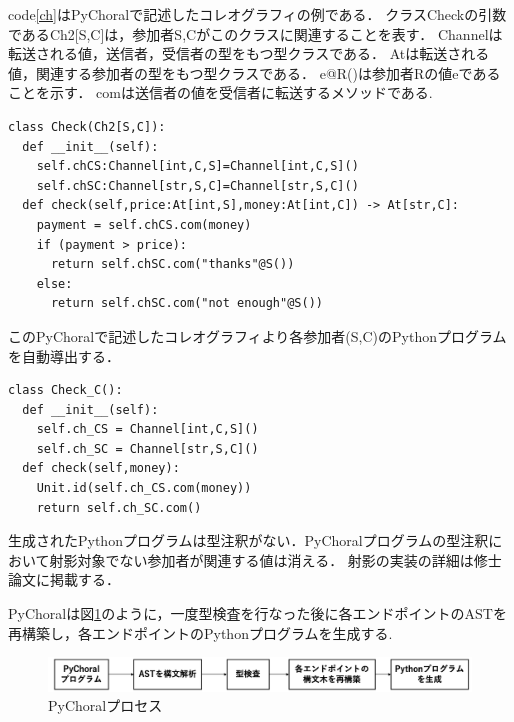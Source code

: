 \documentclass{resume}
\begin{document}
code\ref{ch}はPyChoralで記述したコレオグラフィの例である．
クラス\textsf{Check}の引数である\textsf{Ch2[S,C]}は，参加者S,Cがこのクラスに関連することを表す．
\textsf{Channel}は転送される値，送信者，受信者の型をもつ型クラスである．
\textsf{At}は転送される値，関連する参加者の型をもつ型クラスである．
\textsf{e@R()}は参加者Rの値eであることを示す．
\textsf{com}は送信者の値を受信者に転送するメソッドである.%

\begin{lstlisting}[caption=Staff(S)とCustomer(C)でのお会計時のやり取り,label=ch]
class Check(Ch2[S,C]):
  def __init__(self):
    self.chCS:Channel[int,C,S]=Channel[int,C,S]()
    self.chSC:Channel[str,S,C]=Channel[str,S,C]()
  def check(self,price:At[int,S],money:At[int,C]) -> At[str,C]:
    payment = self.chCS.com(money)
    if (payment > price):
      return self.chSC.com("thanks"@S())
    else:
      return self.chSC.com("not enough"@S())
\end{lstlisting}
\vspace*{-10pt}
このPyChoralで記述したコレオグラフィより各参加者(S,C)のPythonプログラムを自動導出する．
\begin{lstlisting}[caption=生成されたPythonプログラム(Customer)]
class Check_C():
  def __init__(self):
    self.ch_CS = Channel[int,C,S]()
    self.ch_SC = Channel[str,S,C]()
  def check(self,money):
    Unit.id(self.ch_CS.com(money))
    return self.ch_SC.com()
\end{lstlisting}
\vspace*{-10pt}
生成されたPythonプログラムは型注釈がない．PyChoralプログラムの型注釈において射影対象でない参加者が関連する値は消える．
射影の実装の詳細は修士論文に掲載する．

PyChoralは図\ref{pychoralprocess}のように，一度型検査を行なった後に各エンドポイントのASTを再構築し，各エンドポイントのPythonプログラムを生成する.
\vspace{-7pt}
\begin{figure}[H]
  \centering
  \includegraphics[scale=0.225]{image/pychoralprocess.png}
  \caption{PyChoralプロセス}
  \label{pychoralprocess}
\end{figure}
\vspace{-17pt}
\end{document}
